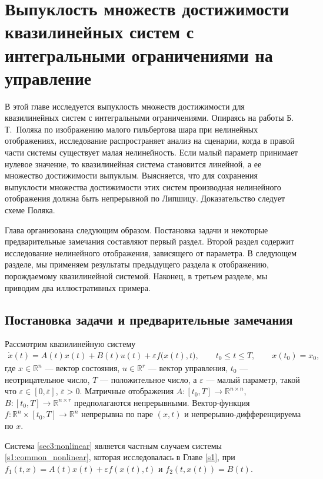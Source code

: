 \documentclass[../main.tex]{subfiles}
\begin{document}
\clearpage
\section{Выпуклость множеств достижимости квазилинейных систем с интегральными ограничениями на управление}
В этой главе исследуется выпуклость множеств достижимости для квазилинейных систем с интегральными ограничениями.  
Опираясь на работы Б.\,Т.~Поляка \cite{Polyak2001,Polyak2004} по изображению малого гильбертова шара при нелинейных отображениях, исследование распространяет анализ на сценарии, когда в правой части системы существует малая нелинейность. 
Если малый параметр принимает нулевое значение, то квазилинейная система становится линейной, а ее множество достижимости выпуклым. 
Выясняется, что для сохранения выпуклости множества достижимости этих систем производная нелинейного отображения должна быть непрерывной по Липшицу. 
Доказательство следует схеме Поляка.  

Глава организована следующим образом. 
Постановка задачи и некоторые предварительные замечания составляют первый раздел. 
Второй раздел содержит исследование нелинейного отображения, зависящего от параметра.  
В следующем разделе, мы применяем результаты предыдущего раздела к отображению, порождаемому квазилинейной системой. 
Наконец, в третьем разделе, мы приводим два иллюстративных примера.

\subsection{Постановка задачи и предварительные замечания}

Рассмотрим квазилинейную систему
\begin{gather}\label{sec3:nonlinear}
    \dot{x}(t) = A(t)x(t)+B(t)u(t)+\varepsilon f\big(x(t),t\big), \qquad t_0 \leqslant t \leqslant T, \qquad x(t_0) = x_0,
\end{gather}
где $ x \in \mathbb{R}^n $ --- вектор состояния, $ u \in \mathbb{R}^r $ --- вектор управления, $t_0$ --- неотрицательное число, $T$ --- положительное число, а $\varepsilon$ --- малый параметр, такой что $\varepsilon \in [0,\overline{\varepsilon}]$, $ \overline{\varepsilon} > 0$. 
Матричные отображения  $A:[t_0,T] \to \mathbb{R}^{n\times n} $, $B: [t_0,T] \to \mathbb{R}^{n\times r} $ предполагаются непрерывными. 
Вектор-функция $f: \mathbb{R}^n \times [t_0,T] \to \mathbb{R}^n$ непрерывна по паре $(x,t)$ и непрерывно-дифференцируема по  $x$.

Система \eqref{sec3:nonlinear} является частным случаем системы \eqref{s1:common_nonlinear}, которая исследовалась в Главе \ref{s1}, при $f_1(t,x) = A(t) x(t) + \varepsilon f(x(t),t)$ и $f_2(t, x(t)) = B(t)$.
\end{document}
